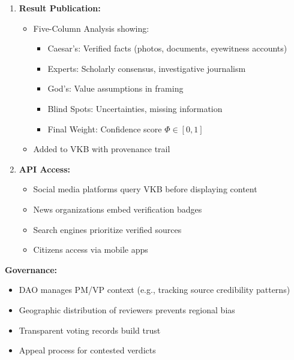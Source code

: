 \documentclass[11pt,a4paper]{article}
\theoremstyle{definition}
\theoremstyle{remark}
\newcommand{\VKB}{\textsc{VKB}}
\newcommand{\DAO}{\textsc{DAO}}
\begin{document}
\begin{mdframed}[style=implementationbox, frametitle={Decentralized Fact-Checking Protocol}]
\begin{enumerate}
    \item \textbf{Result Publication:}
    \begin{itemize}
        \item Five-Column Analysis showing:
        \begin{itemize}
            \item Caesar's: Verified facts (photos, documents, eyewitness accounts)
            \item Experts: Scholarly consensus, investigative journalism
            \item God's: Value assumptions in framing
            \item Blind Spots: Uncertainties, missing information
            \item Final Weight: Confidence score $\Phi \in [0,1]$
        \end{itemize}
        \item Added to \VKB{} with provenance trail
    \end{itemize}
    
    \item \textbf{API Access:}
    \begin{itemize}
        \item Social media platforms query \VKB{} before displaying content
        \item News organizations embed verification badges
        \item Search engines prioritize verified sources
        \item Citizens access via mobile apps
    \end{itemize}
\end{enumerate}

\textbf{Governance:}
\begin{itemize}
    \item \DAO{} manages PM/VP context (e.g., tracking source credibility patterns)
    \item Geographic distribution of reviewers prevents regional bias
    \item Transparent voting records build trust
    \item Appeal process for contested verdicts
\end{itemize}
\end{mdframed}
\end{document}
